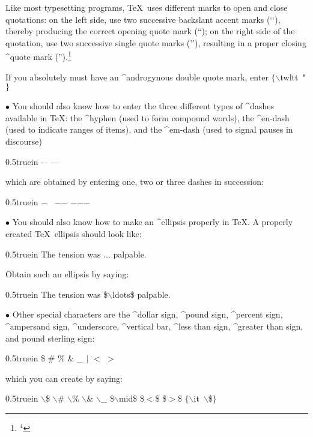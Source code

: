 Like most typesetting programs, \TeX\ uses different
marks to open and close quotations: on the left side, use  
two successive backslant accent marks ({\twltt `{}`}), 
thereby producing the correct
opening quote mark (``); on the right side of the quotation, use 
two successive single quote marks ({\twltt '{}'}), 
resulting in a proper closing ^{quote mark}
('').\footnote{$^{4}$}{If you absolutely must have
an ^{androgynous double quote mark}, enter
{\twltt $\{\backslash$twltt\ {\twltt "}$\}$}\par}
\bigskip\bigskip\par\noindent
$\bullet$ You should also know how to enter the three different types of
^{dashes} available in TeX: 
the ^{hyphen} (used to form compound words), the
^{en-dash} (used to indicate ranges of items), 
and the ^{em-dash} (used to
signal pauses in discourse)
\bigskip\par\noindent\hglue 0.5truein
-\qquad\qquad\enspace\enspace -- \qquad\qquad ---
\bigskip\par\noindent
which are obtained by entering one, two or three dashes in succession:
\bigskip\par\noindent\hglue 0.5truein
{\twltt
$-$
\qquad\quad\
$-${}$-$
\qquad\quad
$-${}$-${}$-${}
}
\bigskip\bigskip\par\noindent
$\bullet$ You should also know how to make an ^{ellipsis}
properly in \TeX{}.
A properly created \TeX\ ellipsis should look like:
\bigskip\par\noindent\hglue 0.5truein
The tension was $\ldots$ palpable.
\bigskip\par\noindent
Obtain such an ellipsis by saying:
\bigskip\par\noindent\hglue 0.5truein
{\twltt The tension was \${}$\backslash${}ldots\${} palpable.}
\bigskip\bigskip\par\noindent
$\bullet$ Other special characters are the
^{dollar sign}, ^{pound sign}, ^{percent sign}, ^{ampersand sign},
^{underscore}, ^{vertical bar}, ^{less than sign}, ^{greater than sign}, 
and pound sterling sign:
\par\noindent\bigskip\hglue 0.5truein
{\twltt \$ \qquad \# \qquad \% \qquad \&
\qquad \_ \qquad\quad $\mid$  
\quad \qquad\enspace $<$ \qquad $>$ \quad \qquad {\it \$}}
\bigskip\par\noindent
which you can create by saying: 
\par\noindent\bigskip\hglue 0.5truein
{\twltt 
$\backslash$\$\qquad
$\backslash$\#\qquad
$\backslash$\%\qquad
$\backslash$\&\qquad
$\backslash$\_\qquad
\${}$\backslash$mid\$\qquad
\${}$<${}\${}\qquad
\${}$>${}\${}\qquad
$\{$$\backslash${\twltt it\ }$\backslash${}\${}$\}$}
